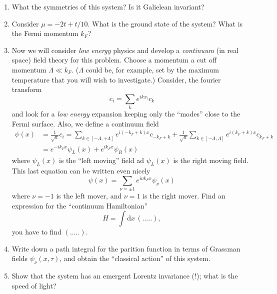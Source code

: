 \documentclass[a4paper,12pt]{article}
\newcommand{\beq}{\begin{equation}}
\newcommand{\eeq}{\end{equation}}
\newcommand{\non}{\nonumber}
\newcommand{\D}[1]{\mbox{d}{#1}}
\begin{document}
\begin{enumerate}
{\begin{enumerate}
	\item What the symmetries of this system? Is it Galielean invariant?
	\item Consider $\mu = -2t + t/10$. What is the ground state of the system? What is the Fermi momentum $k_F$?
	\item Now we will consider {\em low energy} physics and develop a {\em continuum}  (in real space)  field theory for this problem. Choose a momentum a cut off momentum $\Lambda \ll k_F$. ($\Lambda$ could be, for example, set by the maximum temperature that you will wish to investigate.) Consider, the fourier transform
	\beq\non
	c_{i} =  \sum_{k} e^{i k x_i} c_k
	\eeq	
	and look for a {\em low energy } expansion keeping only the ``modes'' close to the Fermi surface. Also, we define a continuum field
	\beq\non
	\begin{split}
	\psi(x) &= \frac{1}{\sqrt{a}}c_i = \sum_{k \in [-\Lambda, + \Lambda]} e^{i (-k_F + k) x} c_{-k_F + k} + \frac{1}{\sqrt{a}}\sum_{k \in [-\Lambda, \Lambda]}e^{i (k_F + k) x} c_{k_F + k} \\
	&= e^{-ik_F x} \psi_L(x) + e^{i k_F x} \psi_R(x)
	\end{split}
	\eeq
where $\psi_L(x)$ is the ``left moving'' field ad $\psi_L(x)$ is the right moving field. This last equation can be written even nicely
\beq\non
\psi(x) = \sum_{\nu = \pm 1} e^{i \nu k_F x} \psi_\nu(x)
\eeq 
where $\nu = -1$ is the left mover, and $\nu = 1$ is the right mover.
Find an expression for the ``continuum Hamiltonian''
\beq\non
H = \int \D{x} \, \left( ..... \right),
\eeq
you have to find $\left( ..... \right)$. 
\item Write down a path integral for the parition function in terms of Grassman fields $\psi_\nu(x,\tau)$, and obtain the ``classical action'' of this system.
\item Show that the system has an emergent Lorentz invariance (!); what is the speed of light?
\end{enumerate}
}

\end{enumerate}
\end{document}
